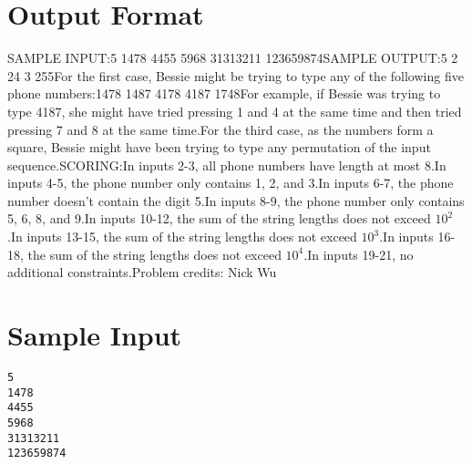 \documentclass[12pt]{article}
\begin{document}
\section*{Output Format}
SAMPLE INPUT:5
1478
4455
5968
31313211
123659874SAMPLE OUTPUT:5
2
24
3
255For the first case, Bessie might be trying to type any of the following five
phone numbers:1478
1487
4178
4187
1748For example, if Bessie was trying to type 4187, she might have tried pressing 1
and 4 at the same time and then tried pressing 7 and 8 at the same time.For the third case, as the numbers form a square, Bessie might have been trying
to type any permutation of the input sequence.SCORING:In inputs 2-3, all phone numbers have length at most $8$.In inputs 4-5, the phone number only contains 1, 2, and 3.In inputs 6-7, the phone number doesn't contain the digit 5.In inputs 8-9, the phone number only contains 5, 6, 8, and 9.In inputs 10-12, the sum of the string lengths does not exceed $10^2$.In inputs 13-15, the sum of the string lengths does not exceed $10^3$.In inputs 16-18, the sum of the string lengths does not exceed $10^4$.In inputs 19-21, no additional constraints.Problem credits: Nick Wu

\section*{Sample Input}
\begin{verbatim}
5
1478
4455
5968
31313211
123659874
\end{verbatim}
\end{document}
